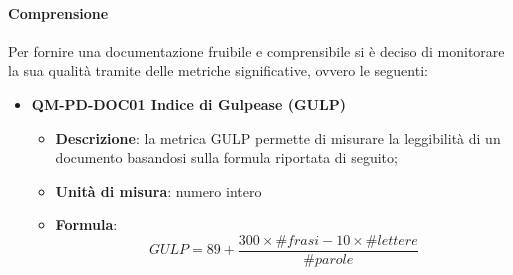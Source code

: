 			\paragraph{Comprensione}
				Per fornire una documentazione fruibile e comprensibile si è deciso di monitorare la sua qualità tramite delle metriche significative, ovvero le seguenti:\\
				\begin{itemize}
					\item\textbf{QM-PD-DOC01 Indice di Gulpease (GULP)}
						\begin{itemize}
							\item\textbf{Descrizione}: la metrica GULP permette di misurare la leggibilità di un documento basandosi sulla formula riportata di seguito;
							\item\textbf{Unità di misura}: numero intero
							\item\textbf{Formula}: \\
								\[GULP = 89+ \frac{300\times\#\mathit{frasi} -10\times\#lettere}{\#parole}\]
								

\end{itemize}
\end{itemize}
